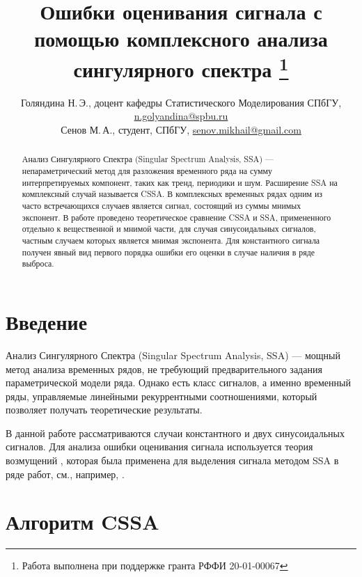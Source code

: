 \documentclass{spisok-article}
\title{Ошибки оценивания сигнала с помощью комплексного анализа сингулярного спектра
    \thanks{Работа выполнена при поддержке гранта РФФИ 20-01-00067}
}
\author{Голяндина Н.\,Э., доцент кафедры Статистического Моделирования СПбГУ,
    \href{mailto:n.golyandina@spbu.ru}{n.golyandina@spbu.ru }\\
    Сенов М.\,А., студент, СПбГУ,
    \href{mailto:senov.mikhail@gmail.com}{senov.mikhail@gmail.com}%
}
\begin{document}
\maketitle

\begin{abstract}
Анализ Сингулярного Спектра (Singular Spectrum Analysis, SSA)
--- непараметрический метод для разложения временного ряда на сумму
интерпретируемых компонент, таких как тренд, периодики и шум. Расширение SSA на комплексный случай называется CSSA. В комплексных временных рядах одним из часто встречающихся случаев является сигнал, состоящий из суммы мнимых экспонент. В работе проведено теоретическое сравнение CSSA и SSA, примененного отдельно к вещественной и мнимой части, для случая синусоидальных сигналов, частным случаем которых является мнимая экспонента. Для константного сигнала получен явный вид первого порядка ошибки его оценки в случае наличия в ряде выброса. 
\end{abstract}

\section{Введение}
Анализ Сингулярного Спектра (Singular Spectrum Analysis, SSA)  \cite{Golyandina.etal2001}
 --- мощный метод анализа временных
рядов, не требующий предварительного задания параметрической модели ряда.
Однако есть класс сигналов, а именно временный ряды, управляемые линейными рекуррентными соотношениями, который позволяет получать теоретические результаты.

В данной работе рассматриваются случаи константного и двух синусоидальных сигналов. 
Для анализа ошибки оценивания сигнала используется теория возмущений \cite{Kato}, которая была применена для выделения сигнала методом SSA в ряде работ, см., например, \cite{Nekrutkin}. 


\section{Алгоритм CSSA}
\label{sec:basessa}
\end{document}
